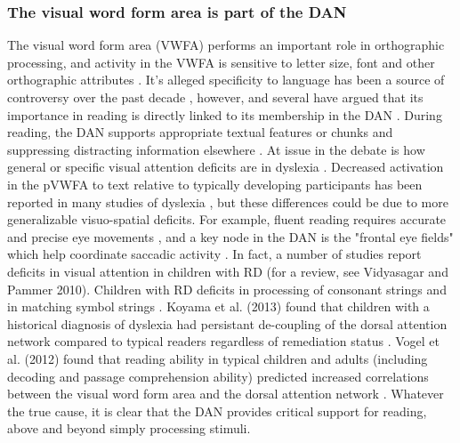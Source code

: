 \subsubsection{The visual word form area is part of the DAN} 
The visual word form area (VWFA) performs an important role in orthographic processing, and activity in the VWFA is sensitive to letter size, font and other orthographic attributes \cite{References from Vogel2011}. It's alleged specificity to language has been a source of controversy over the past decade \cite{...}, however, and several have argued that its importance in reading is directly linked to its membership in the DAN \cite{Vogel2014}. During reading, the DAN supports appropriate textual features or chunks and suppressing distracting information elsewhere \cite{Corbetta2002}. At issue in the debate is how general or specific visual attention deficits are in dyslexia \cite{Vogel2011}. Decreased activation in the pVWFA to text relative to typically developing participants has been reported in many studies of dyslexia \cite{...}, but these differences could be due to more generalizable visuo-spatial deficits. For example, fluent reading requires accurate and precise eye movements \cite{Rayner1998}, and a key node in the DAN is the "frontal eye fields" which help coordinate saccadic activity \cite{Petit1997,Connolly2000}. In fact, a number of studies report deficits in visual attention in children with RD (for a review, see Vidyasagar and Pammer 2010). Children with RD deficits in processing of consonant strings \cite{Pammer2004} and in matching symbol strings \cite{LassusSangosse2008}. Koyama et al. (2013) found that children with a historical diagnosis of dyslexia had persistant de-coupling of the dorsal attention network compared to typical readers regardless of remediation status \cite{Koyama2013}. Vogel et al. (2012) found that reading ability in typical children and adults (including decoding and passage comprehension ability) predicted increased correlations between the visual word form area and the dorsal attention network \cite{Vogel2012}. Whatever the true cause, it is clear that the DAN provides critical support for reading, above and beyond simply processing stimuli.


